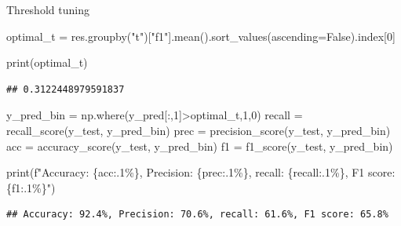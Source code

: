 \documentclass[
  10pt,
  ignorenonframetext,
  aspectratio=169]{beamer}
\newenvironment{Shaded}{\begin{snugshade}}{\end{snugshade}}
\newcommand{\BuiltInTok}[1]{\textcolor[rgb]{0.80,0.80,0.80}{#1}}
\newcommand{\DecValTok}[1]{\textcolor[rgb]{0.86,0.86,0.80}{#1}}
\newcommand{\NormalTok}[1]{\textcolor[rgb]{0.80,0.80,0.80}{#1}}
\newcommand{\OperatorTok}[1]{\textcolor[rgb]{0.94,0.94,0.82}{#1}}
\newcommand{\SpecialCharTok}[1]{\textcolor[rgb]{0.86,0.64,0.64}{#1}}
\newcommand{\SpecialStringTok}[1]{\textcolor[rgb]{0.80,0.58,0.58}{#1}}
\newcommand{\StringTok}[1]{\textcolor[rgb]{0.80,0.58,0.58}{#1}}
\newcommand{\VariableTok}[1]{\textcolor[rgb]{0.80,0.80,0.80}{#1}}
\begin{document}
\begin{frame}[fragile]{Threshold tuning}
\protect\hypertarget{threshold-tuning-1}{}
\medskip
\scriptsize

\begin{Shaded}
\begin{Highlighting}[]
\NormalTok{optimal\_t }\OperatorTok{=}\NormalTok{ res.groupby(}\StringTok{"t"}\NormalTok{)[}\StringTok{"f1"}\NormalTok{].mean().sort\_values(ascending}\OperatorTok{=}\VariableTok{False}\NormalTok{).index[}\DecValTok{0}\NormalTok{]}

\BuiltInTok{print}\NormalTok{(optimal\_t)}
\end{Highlighting}
\end{Shaded}

\begin{verbatim}
## 0.3122448979591837
\end{verbatim}

\begin{Shaded}
\begin{Highlighting}[]
\NormalTok{y\_pred\_bin }\OperatorTok{=}\NormalTok{ np.where(y\_pred[:,}\DecValTok{1}\NormalTok{]}\OperatorTok{\textgreater{}}\NormalTok{optimal\_t,}\DecValTok{1}\NormalTok{,}\DecValTok{0}\NormalTok{)}
\NormalTok{recall }\OperatorTok{=}\NormalTok{ recall\_score(y\_test, y\_pred\_bin)}
\NormalTok{prec }\OperatorTok{=}\NormalTok{ precision\_score(y\_test, y\_pred\_bin)}
\NormalTok{acc }\OperatorTok{=}\NormalTok{ accuracy\_score(y\_test, y\_pred\_bin)}
\NormalTok{f1 }\OperatorTok{=}\NormalTok{ f1\_score(y\_test, y\_pred\_bin)}

\BuiltInTok{print}\NormalTok{(}\SpecialStringTok{f"Accuracy: }\SpecialCharTok{\{}\NormalTok{acc}\SpecialCharTok{:.1\%\}}\SpecialStringTok{, Precision: }\SpecialCharTok{\{}\NormalTok{prec}\SpecialCharTok{:.1\%\}}\SpecialStringTok{, recall: }\SpecialCharTok{\{}\NormalTok{recall}\SpecialCharTok{:.1\%\}}\SpecialStringTok{, F1 score: }\SpecialCharTok{\{}\NormalTok{f1}\SpecialCharTok{:.1\%\}}\SpecialStringTok{"}\NormalTok{)}
\end{Highlighting}
\end{Shaded}

\begin{verbatim}
## Accuracy: 92.4%, Precision: 70.6%, recall: 61.6%, F1 score: 65.8%
\end{verbatim}
\end{frame}
\end{document}
